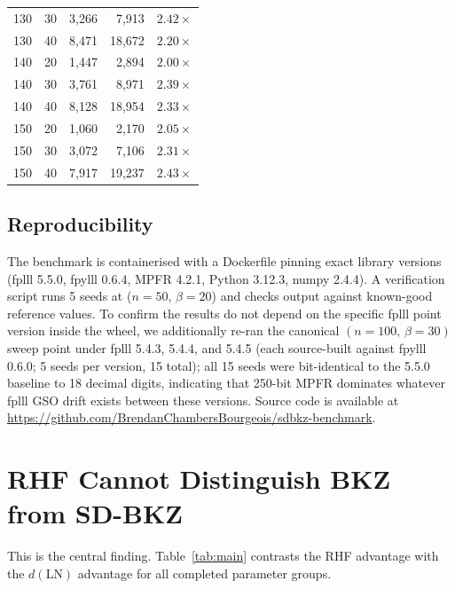 \documentclass[journal=cic,version=preprint]{iacrj}
\begin{document}
\begin{table}[tbp]
\begin{tabular}{rrrrr}
130 & 30 & 3{,}266  & 7{,}913  & $2.42\times$ \\
130 & 40 & 8{,}471  & 18{,}672 & $2.20\times$ \\
140 & 20 & 1{,}447  & 2{,}894  & $2.00\times$ \\
140 & 30 & 3{,}761  & 8{,}971  & $2.39\times$ \\
140 & 40 & 8{,}128  & 18{,}954 & $2.33\times$ \\
150 & 20 & 1{,}060  & 2{,}170  & $2.05\times$ \\
150 & 30 & 3{,}072  & 7{,}106  & $2.31\times$ \\
150 & 40 & 7{,}917  & 19{,}237 & $2.43\times$ \\
\hline
\end{tabular}
\end{table}

\subsection{Reproducibility}

The benchmark is containerised with a Dockerfile pinning exact library versions (fplll 5.5.0, fpylll 0.6.4, MPFR 4.2.1, Python 3.12.3, numpy 2.4.4). A verification script runs 5 seeds at ($n=50$, $\beta=20$) and checks output against known-good reference values. To confirm the results do not depend on the specific fplll point version inside the wheel, we additionally re-ran the canonical $(n=100,\,\beta=30)$ sweep point under fplll 5.4.3, 5.4.4, and 5.4.5 (each source-built against fpylll 0.6.0; 5 seeds per version, 15 total); all 15 seeds were bit-identical to the 5.5.0 baseline to 18 decimal digits, indicating that 250-bit MPFR dominates whatever fplll GSO drift exists between these versions. Source code is available at \url{https://github.com/BrendanChambersBourgeois/sdbkz-benchmark}.

\section{RHF Cannot Distinguish BKZ from SD-BKZ}
\label{sec:rhf-blind}

This is the central finding. Table~\ref{tab:main} contrasts the RHF advantage with the $d(\mathrm{LN})$ advantage for all completed parameter groups.
\end{document}

